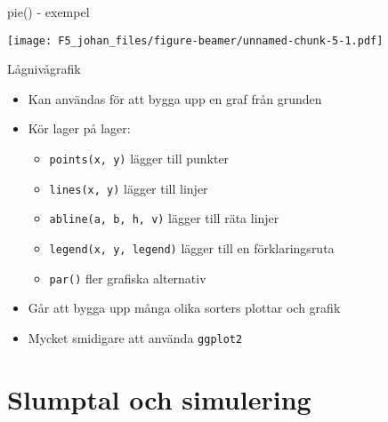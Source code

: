 \documentclass[
  11pt,
  ignorenonframetext,
  handout]{beamer}
\newenvironment{Shaded}{\begin{snugshade}}{\end{snugshade}}
\newcommand{\FunctionTok}[1]{\textcolor[rgb]{0.00,0.00,0.00}{#1}}
\newcommand{\NormalTok}[1]{#1}
\newcommand{\OtherTok}[1]{\textcolor[rgb]{0.56,0.35,0.01}{#1}}
\newcommand{\SpecialCharTok}[1]{\textcolor[rgb]{0.00,0.00,0.00}{#1}}
\providecommand{\tightlist}{%
  \setlength{\itemsep}{0pt}\setlength{\parskip}{0pt}}
\begin{document}
\begin{frame}[fragile]{pie() - exempel}
\protect\hypertarget{pie---exempel}{}
\begin{Shaded}
\end{Shaded}

\texttt{[image: F5\_johan\_files/figure-beamer/unnamed-chunk-5-1.pdf]}
\end{frame}

\begin{frame}{Lågnivågrafik}
\protect\hypertarget{luxe5gnivuxe5grafik}{}
\begin{itemize}
\tightlist
\item
  Kan användas för att bygga upp en graf från grunden
\item
  Kör lager på lager:

  \begin{itemize}
  \tightlist
  \item
    \texttt{points(x, y)} lägger till punkter
  \item
    \texttt{lines(x, y)} lägger till linjer
  \item
    \texttt{abline(a, b, h, v)} lägger till räta linjer
  \item
    \texttt{legend(x, y, legend)} lägger till en förklaringsruta
  \item
    \texttt{par()} fler grafiska alternativ
  \end{itemize}
\item
  Går att bygga upp många olika sorters plottar och grafik
\item
  Mycket smidigare att använda \texttt{ggplot2}
\end{itemize}
\end{frame}

\hypertarget{slumptal-och-simulering}{%
\section{Slumptal och simulering}\label{slumptal-och-simulering}}
\end{document}
